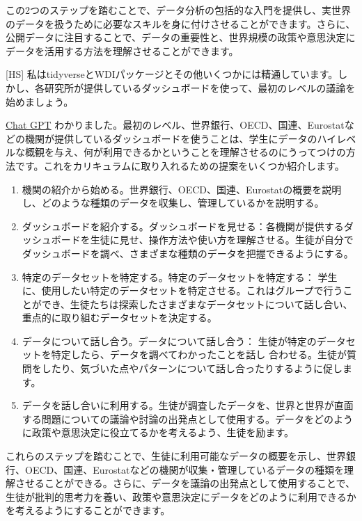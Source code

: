\documentclass[
]{book}
\theoremstyle{definition}
\theoremstyle{definition}
\theoremstyle{definition}
\theoremstyle{definition}
\theoremstyle{remark}
\begin{document}
この2つのステップを踏むことで、データ分析の包括的な入門を提供し、実世界のデータを扱うために必要なスキルを身に付けさせることができます。さらに、公開データに注目することで、データの重要性と、世界規模の政策や意思決定にデータを活用する方法を理解させることができます。

{[}HS{]} 私はtidyverseとWDIパッケージとその他いくつかには精通しています。しかし、各研究所が提供しているダッシュボードを使って、最初のレベルの議論を始めましょう。

\protect\hyperlink{chatgpt}{Chat GPT} わかりました。最初のレベル、世界銀行、OECD、国連、Eurostatなどの機関が提供しているダッシュボードを使うことは、学生にデータのハイレベルな概観を与え、何が利用できるかということを理解させるのにうってつけの方法です。これをカリキュラムに取り入れるための提案をいくつか紹介します。

\begin{enumerate}
\def\labelenumi{\arabic{enumi}.}
\item
  機関の紹介から始める。世界銀行、OECD、国連、Eurostatの概要を説明し、どのような種類のデータを収集し、管理しているかを説明する。
\item
  ダッシュボードを紹介する。ダッシュボードを見せる：各機関が提供するダッシュボードを生徒に見せ、操作方法や使い方を理解させる。生徒が自分でダッシュボードを調べ、さまざまな種類のデータを把握できるようにする。
\item
  特定のデータセットを特定する。特定のデータセットを特定する： 学生に、使用したい特定のデータセットを特定させる。これはグループで行うことができ、生徒たちは探索したさまざまなデータセットについて話し合い、重点的に取り組むデータセットを決定する。
\item
  データについて話し合う。データについて話し合う： 生徒が特定のデータセットを特定したら、データを調べてわかったことを話し 合わせる。生徒が質問をしたり、気づいた点やパターンについて話し合ったりするように促します。
\item
  データを話し合いに利用する。生徒が調査したデータを、世界と世界が直面する問題についての議論や討論の出発点として使用する。データをどのように政策や意思決定に役立てるかを考えるよう、生徒を励ます。
\end{enumerate}

これらのステップを踏むことで、生徒に利用可能なデータの概要を示し、世界銀行、OECD、国連、Eurostatなどの機関が収集・管理しているデータの種類を理解させることができる。さらに、データを議論の出発点として使用することで、生徒が批判的思考力を養い、政策や意思決定にデータをどのように利用できるかを考えるようにすることができます。
\end{document}
